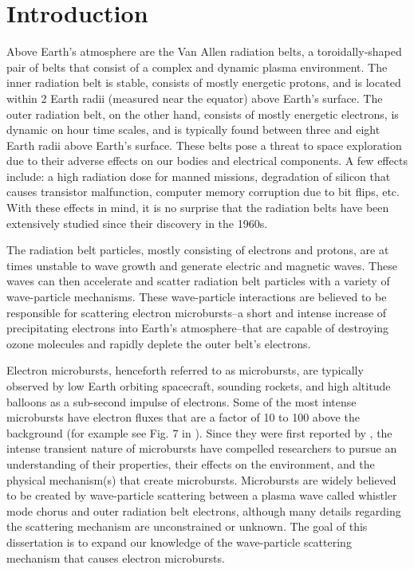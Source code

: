 \chapter{Introduction}\label{CH:introduction}
Above Earth's atmosphere are the Van Allen radiation belts, a toroidally-shaped pair of belts that consist of a complex and dynamic plasma environment. The inner radiation belt is stable, consists of mostly energetic protons, and is located within 2 Earth radii (measured near the equator) above Earth's surface. The outer radiation belt, on the other hand, consists of mostly energetic electrons, is dynamic on hour time scales, and is typically found between three and eight Earth radii above Earth's surface. These belts pose a threat to space exploration due to their adverse effects on our bodies and electrical components. A few effects include: a high radiation dose for manned missions, degradation of silicon that causes transistor malfunction, computer memory corruption due to bit flips, etc. With these effects in mind, it is no surprise that the radiation belts have been extensively studied since their discovery in the 1960s.

The radiation belt particles, mostly consisting of electrons and protons, are at times unstable to wave growth and generate electric and magnetic waves. These waves can then accelerate and scatter radiation belt particles with a variety of wave-particle mechanisms. These wave-particle interactions are believed to be responsible for scattering electron microbursts--a short and intense increase of precipitating electrons into Earth's atmosphere--that are capable of destroying ozone molecules and rapidly deplete the outer belt's electrons.

Electron microbursts, henceforth referred to as microbursts, are typically observed by low Earth orbiting spacecraft, sounding rockets, and high altitude balloons as a sub-second impulse of electrons. Some of the most intense microbursts have electron fluxes that are a factor of 10 to 100 above the background (for example see Fig. 7 in \citet{Blake1996}). Since they were first reported by \citet{Anderson1964}, the intense transient nature of microbursts have compelled researchers to pursue an understanding of their properties, their effects on the environment, and the physical mechanism(s) that create microbursts. Microbursts are widely believed to be created by wave-particle scattering between a plasma wave called whistler mode chorus and outer radiation belt electrons, although many details regarding the scattering mechanism are unconstrained or unknown. The goal of this dissertation is to expand our knowledge of the wave-particle scattering mechanism that causes electron microbursts.

